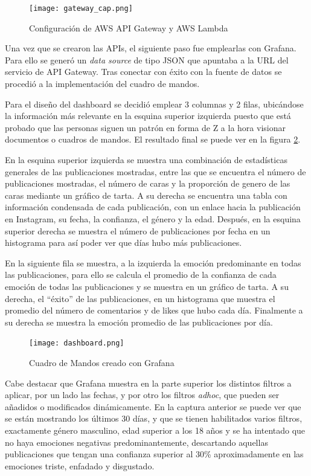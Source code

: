 \begin{figure}[H]
    \hspace*{-2cm}
    \centering
    \texttt{[image: gateway\_cap.png]}
    \caption{Configuración de AWS API Gateway y AWS Lambda}
    \label{fig:gateway_cap}
\end{figure}

Una vez que se crearon las APIs, el siguiente paso fue emplearlas con Grafana. Para ello se generó un \textit{data source} de tipo JSON que apuntaba a la URL del servicio de API Gateway. Tras conectar con éxito con la fuente de datos se procedió a la implementación del cuadro de mandos.

Para el diseño del dashboard se decidió emplear 3 columnas y 2 filas, ubicándose la información más relevante en la esquina superior izquierda puesto que está probado que las personas siguen un patrón en forma de Z a la hora visionar documentos o cuadros de mandos. El resultado final se puede ver en la figura \ref{fig:dashboard}.

En la esquina superior izquierda se muestra una combinación de estadísticas generales de las publicaciones mostradas, entre las que se encuentra el número de publicaciones mostradas, el número de caras y la proporción de genero de las caras mediante un gráfico de tarta. A su derecha se encuentra una tabla con información condensada de cada publicación, con un enlace hacia la publicación en Instagram, su fecha, la confianza, el género y la edad. Después, en la esquina superior derecha se muestra el número de publicaciones por fecha en un histograma para así poder ver que días hubo más publicaciones.

En la siguiente fila se muestra, a la izquierda la emoción predominante en todas las publicaciones, para ello se calcula el promedio de la confianza de cada emoción de todas las publicaciones y se muestra en un gráfico de tarta. A su derecha, el ``éxito'' de las publicaciones, en un histograma que muestra el promedio del número de comentarios y de likes que hubo cada día. Finalmente a su derecha se muestra la emoción promedio de las publicaciones por día.

\begin{figure}[H]
    \hspace*{-1.5cm}
    \centering
    \texttt{[image: dashboard.png]}
    \caption{Cuadro de Mandos creado con Grafana}
    \label{fig:dashboard}
\end{figure}

Cabe destacar que Grafana muestra en la parte superior los distintos filtros a aplicar, por un lado las fechas, y por otro los filtros \textit{adhoc}, que pueden ser añadidos o modificados dinámicamente. En la captura anterior se puede ver que se están mostrando los últimos 30 días, y que se tienen habilitados varios filtros, exactamente género masculino, edad superior a los 18 años y se ha intentado que no haya emociones negativas predominantemente, descartando aquellas publicaciones que tengan una confianza superior al 30\% aproximadamente en las emociones triste, enfadado y disgustado.
